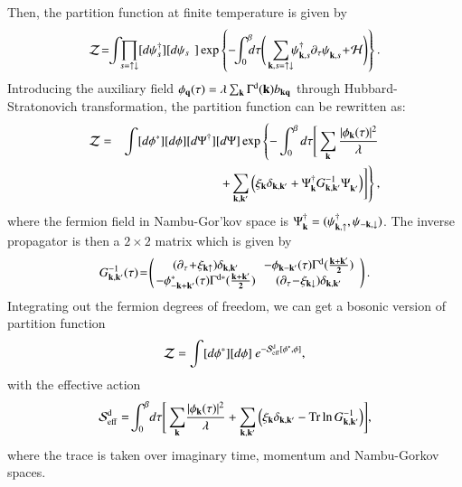 \documentclass[aps,prd,amsmath,two column,nofootinbib,amssymb,referee]{revtex4}
\begin{document}
Then, the partition function at finite temperature is given by
\begin{eqnarray}
{\cal Z}\!=\!\!\int\!\!\prod_{s=\uparrow\downarrow} [d{\psi_s^\dagger}][d{\psi_s}^{\phantom{\dag}}]\exp\left\{-\!\!\int_0^\beta \!\!\!d\tau\Bigg(\sum_{{\bf k},s=\uparrow\downarrow}
\!\!\psi_{{\bf k},s}^\dagger\partial_\tau\psi_{{\bf k},s}^{\phantom{\dag}}\!+\!{\cal H}\Bigg)\right\}.
\end{eqnarray}
Introducing the auxiliary field $\phi_{\bf q}(\tau)=\lambda\sum_{{\bf k}}\Gamma^{\rm d}({\bf k})b_{{\bf kq}}$ through Hubbard-Stratonovich transformation, the partition function can be rewritten as:
\begin{eqnarray}
{\cal Z}&=&\int  [d{\phi^*}][d{\phi}][d{\Psi^\dagger}][d{\Psi}]\exp\left\{-\int_0^\beta d\tau\Bigg[\sum_{\bf k}{|\phi_{\bf k}(\tau)|^2\over\lambda}\right.\nonumber\\
&&\left.+\sum_{{\bf k,k'}}\Big(\xi_{\bf k}\delta_{\bf k,k'}+\Psi_{{\bf k}}^\dagger G^{-1}_{\bf k,k'}\Psi_{{\bf k'}}^{\phantom{\dag}}\Big)\Bigg]\right\},
\end{eqnarray}
where the fermion field in Nambu-Gor'kov space is $\Psi_{{\bf k}}^\dagger=(\psi_{{\bf k},\uparrow}^\dagger,\psi_{-{\bf k},\downarrow})$. The inverse propagator is then a $2\times2$ matrix which is given by
\begin{eqnarray}
G^{-1}_{\bf k,k'}(\tau)
\!=\!\left(\begin{array}{cc}
\!\!(\partial_\tau\!+\!\xi_{{\bf k}\uparrow})\delta_{\bf k,k'}&\!\!-\phi_{\bf k-k'}(\tau)\Gamma^{\rm d}({\bf k+k'\over2})\\
\!\!-\phi_{\bf -k+k'}^*(\tau)\Gamma^{{\rm d}*}({\bf k+k'\over2})&\!\!(\partial_\tau\!-\!\xi_{{\bf k}\downarrow})\delta_{\bf k,k'}
\end{array}\right).
\end{eqnarray}
Integrating out the fermion degrees of freedom, we can get a bosonic version of partition function
\begin{eqnarray}
{\cal Z}=\int [d{\phi^*}][d{\phi}]~e^{-{\cal S}_{\rm eff}^{\rm d}[\phi^*,\phi]},
\end{eqnarray}
with the effective action
\begin{eqnarray}
{\cal S}_{\rm eff}^{\rm d}=\!\int_0^\beta\! d\tau\Bigg[\sum_{\bf k}\!{|\phi_{\bf k}(\tau)|^2\over\lambda}
+\sum_{{\bf k,k'}}\Big(\xi_{\bf k}\delta_{\bf k,k'}-\text{Tr}\ln G^{-1}_{\bf k,k'}\Big)\Bigg],
\end{eqnarray}
where the trace is taken over imaginary time, momentum and Nambu-Gorkov spaces.  
\end{document}
